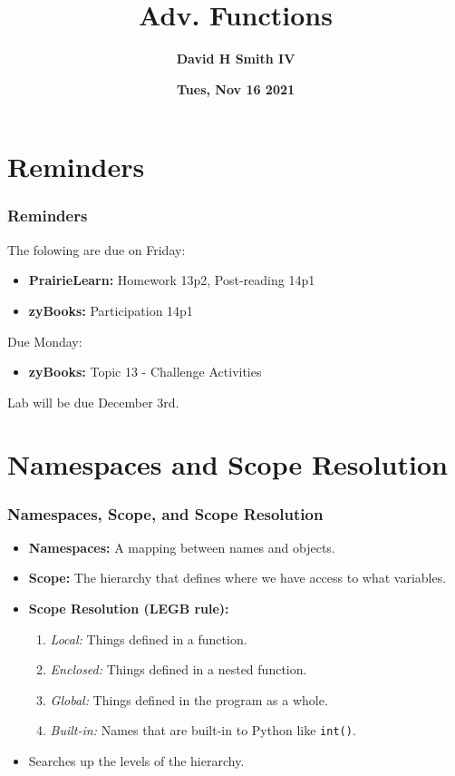 \documentclass{beamer}
\title{\textbf{Adv. Functions}}
\author{\textbf{David H Smith IV}}
\institute[\textbf{UIUC}]{\textbf{University of Illinois Urbana-Champaign}}
\date{\textbf{Tues, Nov 16 2021}}
\begin{document}
\frame{\titlepage}

\section{Reminders}

%
%
\begin{frame}
  \frametitle{Reminders}
  The folowing are due on Friday:
  \begin{itemize}
    \item \textbf{PrairieLearn:} Homework 13p2, Post-reading 14p1
    \item \textbf{zyBooks:} Participation 14p1
  \end{itemize}
  \vfill
  Due Monday:
  \begin{itemize}
    \item \textbf{zyBooks:} Topic 13 - Challenge Activities 
  \end{itemize}
  \vfill
  Lab will be due December 3rd.
\end{frame}

\section{Namespaces and Scope Resolution}

%
%
\begin{frame}[fragile]
  \frametitle{Namespaces, Scope, and Scope Resolution}
  \begin{itemize}
    \item \textbf{Namespaces: } A mapping between names and objects.
    \pause 
    \item \textbf{Scope: } The hierarchy that defines where we have access to what variables.
    \pause
    \item \textbf{Scope Resolution (LEGB rule):}
      \begin{enumerate}
        \item \textit{Local:} Things defined in a function.
        \item \textit{Enclosed:} Things defined in a nested function.
        \item \textit{Global:} Things defined in the program as a whole.
        \item \textit{Built-in:} Names that are built-in to Python like \lstinline|int()|.
      \end{enumerate}
    \pause
    \item Searches up the levels of the hierarchy.
  \end{itemize}
\end{frame}
\end{document}
